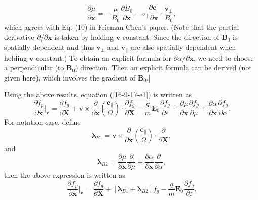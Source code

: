 \documentclass{article}
\newcommand{\nobracket}{}
\newcommand{\tmmathbf}[1]{\ensuremath{\boldsymbol{#1}}}
\begin{document}
\begin{equation}
  \frac{\partial \mu}{\partial \mathbf{x}} = - \frac{\mu}{B_0}  \frac{\partial
  B_0}{\partial \mathbf{x}} - v_{\parallel} \frac{\partial
  \mathbf{e}_{\parallel}}{\partial \mathbf{x}} \cdot
  \frac{\mathbf{v}_{\perp}}{B_0},
\end{equation}
which agrees with Eq. (10) in Frieman-Chen's paper{\cite{frieman1982}}. (Note
that the partial derivative $\partial / \partial \mathbf{x}$ is taken by
holding $\mathbf{v}$ constant. Since the direction of $\mathbf{B}_0$ is
spatially dependent and thus $\mathbf{v}_{\perp}$ and $\mathbf{v}_{\parallel}$
are also spatially dependent when holding $\mathbf{v}$ constant.) To obtain an
explicit formula for $\partial \alpha / \partial \mathbf{x}$, we need to
choose a perpendicular (to $\mathbf{B}_0$) direction. Then an explicit formula
can be derived (not given here), which involves the gradient of
$\mathbf{B}_0$.]

Using the above results, equation (\ref{16-9-17-e1}) is written as
\begin{equation}
  \frac{\partial f_p}{\partial \mathbf{x}} |_{\mathbf{v}} \nobracket =
  \frac{\partial f_g}{\partial \mathbf{X}} +\mathbf{v} \times
  \frac{\partial}{\partial \mathbf{x}} \left(
  \frac{\tmmathbf{e}_{\parallel}}{\Omega} \right) \cdot \frac{\partial
  f_g}{\partial \mathbf{X}} - \frac{q}{m} \mathbf{E}_0 \frac{\partial
  f_g}{\partial \varepsilon} + \frac{\partial \mu}{\partial \mathbf{x}} 
  \frac{\partial f_g}{\partial \mu} + \frac{\partial \alpha}{\partial
  \mathbf{x}}  \frac{\partial f_g}{\partial \alpha} .
\end{equation}
For notation ease, define
\begin{equation}
  \label{18-9-16-1} \tmmathbf{\lambda}_{B 1} =\mathbf{v} \times
  \frac{\partial}{\partial \mathbf{x}} \left(
  \frac{\tmmathbf{e}_{\parallel}}{\Omega} \right) \cdot
  \frac{\partial}{\partial \mathbf{X}},
\end{equation}
and
\begin{equation}
  \label{18-9-16-2} \tmmathbf{\lambda}_{B 2} = \frac{\partial \mu}{\partial
  \mathbf{x}}  \frac{\partial}{\partial \mu} + \frac{\partial \alpha}{\partial
  \mathbf{x}}  \frac{\partial}{\partial \alpha},
\end{equation}
then the above expression is written as
\begin{equation}
  \label{17-9-2-p1} \frac{\partial f_p}{\partial \mathbf{x}} |_{\mathbf{v}}
  \nobracket = \frac{\partial f_g}{\partial \mathbf{X}} +
  [\tmmathbf{\lambda}_{B 1} +\tmmathbf{\lambda}_{B 2}] f_g - \frac{q}{m}
  \mathbf{E}_0 \frac{\partial f_g}{\partial \varepsilon} .
\end{equation}
\end{document}
